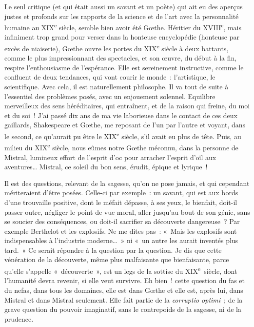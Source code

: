 \documentclass[french,twoside]{book} %
\begin{document}
Le seul critique (et qui était aussi un savant et un poète) qui ait eu des aperçus justes et profonds sur les rapports de la science et de l’art avec la personnalité humaine au XIX\textsuperscript{e} siècle, semble bien avoir été Gœthe. Héritier du XVIII\textsuperscript{e}, mais infiniment trop grand pour verser dans la honteuse encyclopédie (honteuse par excès de niaiserie), Gœthe ouvre les portes du XIX\textsuperscript{e} siècle à deux battants, comme le plus impressionnant des spectacles, et son œuvre, du début à la fin, respire l’enthousiasme de l’espérance. Elle est sereinement instructive, comme le confluent de deux tendances, qui vont courir le monde : l’artistique, le scientifique. Avec cela, il est naturellement philosophe. Il va tout de suite à l’essentiel des problèmes posés, avec un enjouement solennel. Equilibre merveilleux des sens héréditaires, qui entraînent, et de la raison qui freine, du moi et du soi ! J’ai passé dix ans de ma vie laborieuse dans le contact de ces deux gaillards, Shakespeare et Gœthe, me reposant de l’un par l’autre et voyant, dans le second, ce qu’aurait pu être le XIX\textsuperscript{e} siècle, s’il avait eu plus de tête. Puis, au milieu du XIX\textsuperscript{e} siècle, nous eûmes notre Gœthe méconnu, dans la personne de Mistral, lumineux effort de l’esprit d’oc pour arracher l’esprit d’oïl aux aventures… Mistral, ce soleil du bon sens, érudit, épique et lyrique !\par
Il est des questions, relevant de la sagesse, qu’on ne pose jamais, et qui cependant mériteraient d’être posées. Celle-ci par exemple : un savant, qui est aux bords d’une trouvaille positive, dont le méfait dépasse, à ses yeux, le bienfait, doit-il passer outre, négliger le point de vue moral, aller jusqu’au bout de son génie, sans se soucier des conséquences, ou doit-il sacrifier sa découverte dangereuse ? Par exemple Berthelot et les explosifs. Ne me dites pas : « Mais les explosifs sont indispensables à l’industrie moderne… » ni « un autre les aurait inventés plus tard. » Ce serait répondre à la question par la question. Je dis que cette vénération de la découverte, même plus malfaisante que bienfaisante, parce qu’elle s’appelle « découverte », est un legs de la sottise du XIX\textsuperscript{e} siècle, dont l’humanité devra revenir, si elle veut survivre. Eh bien ! cette question du fas et du nefas, dans tous les domaines, elle est dans Gœthe et elle est, après lui, dans Mistral et dans Mistral seulement. Elle fait partie de la {\itshape corruptio optimi} ; de la grave question du pouvoir imaginatif, sans le contrepoids de la sagesse, ni de la prudence.\par
\end{document}
